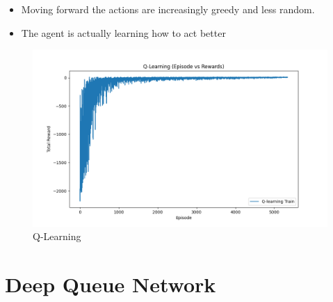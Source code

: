 \documentclass{article}
\begin{document}
\begin{itemize}
  \item Moving forward the actions are increasingly greedy and less random.
  \item The agent is actually learning how to act better
\end{itemize}

\begin{figure}
  \includegraphics[width=\linewidth]{qlearning.png}
  \caption{Q-Learning}
  \label{fig:qlearning}
\end{figure}

\section{Deep Queue Network}
\end{document}
